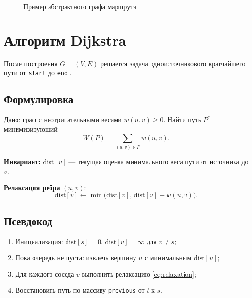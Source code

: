 \begin{figure}[H]
\centering
{}
\caption{Пример абстрактного графа маршрута}
\label{fig:graph-scheme}
\end{figure}

\section{Алгоритм Dijkstra}
\label{sec:dijkstra}

После построения $G = (V, E)$ решается задача одноисточникового кратчайшего пути
от \texttt{start} до \texttt{end} \cite{dijkstra1959,cormen2022}.

\subsection{Формулировка}

Дано: граф с неотрицательными весами $w(u,v) \geq 0$. Найти путь $P^*$ минимизирующий
\begin{equation}
  W(P) = \sum_{(u,v) \in P} w(u, v).
  \label{eq:path-weight}
\end{equation}

\textbf{Инвариант:} $\mathrm{dist}[v]$ --- текущая оценка минимального веса пути
от источника до $v$.

\textbf{Релаксация ребра} $(u, v)$:
\begin{equation}
  \mathrm{dist}[v] \leftarrow \min\bigl(\mathrm{dist}[v],\, \mathrm{dist}[u] + w(u, v)\bigr).
  \label{eq:relaxation}
\end{equation}

\subsection{Псевдокод}

\begin{enumerate}
  \item Инициализация: $\mathrm{dist}[s] = 0$, $\mathrm{dist}[v] = \infty$ для $v \neq s$;
  \item Пока очередь не пуста: извлечь вершину $u$ с минимальным $\mathrm{dist}[u]$;
  \item Для каждого соседа $v$ выполнить релаксацию \eqref{eq:relaxation};
  \item Восстановить путь по массиву \texttt{previous} от $t$ к $s$.
\end{enumerate}

